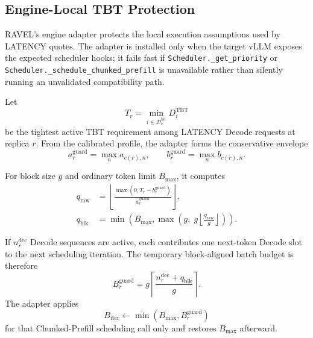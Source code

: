 \subsection{Engine-Local TBT Protection}
\label{sec:appendix:tbt-control}

RAVEL's engine adapter protects the local execution assumptions used by
LATENCY quotes.
The adapter is installed only when the target vLLM exposes the expected
scheduler hooks; it fails fast if
\texttt{Scheduler.\_get\_priority} or
\texttt{Scheduler.\_schedule\_chunked\_prefill} is unavailable rather than
silently running an unvalidated compatibility path.

Let
\begin{equation}
    T_r
    =
    \min_{i\in\mathcal{D}^{\mathrm{lat}}_r}
       D_i^{\mathrm{TBT}}
    \label{eq:appendix:tightest-tbt}
\end{equation}
be the tightest active TBT requirement among LATENCY Decode requests at
replica $r$.
From the calibrated profile, the adapter forms the conservative envelope
\begin{equation}
    a^{\mathrm{guard}}_r=\max_n a_{c(r),n},
    \qquad
    b^{\mathrm{guard}}_r=\max_n b_{c(r),n}.
    \label{eq:appendix:prefill-guard-envelope}
\end{equation}

For block size $g$ and ordinary token limit $B_{\max}$, it computes
\begin{align}
    q_{\mathrm{raw}}
    &=
      \left\lfloor
         \frac{\max(0,T_r-b^{\mathrm{guard}}_r)}
              {a^{\mathrm{guard}}_r}
      \right\rfloor,
      \label{eq:appendix:chunk-raw}\\
    q_{\mathrm{blk}}
    &=
      \min\!\left(
        B_{\max},
        \max\!\left(
          g,\;
          g\left\lfloor\frac{q_{\mathrm{raw}}}{g}\right\rfloor
        \right)
      \right).
      \label{eq:appendix:chunk-aligned}
\end{align}

If $n_r^{\mathrm{dec}}$ Decode sequences are active, each contributes one
next-token Decode slot to the next scheduling iteration.
The temporary block-aligned batch budget is therefore
\begin{equation}
    B^{\mathrm{guard}}_r
    =
    g
    \left\lceil
       \frac{n_r^{\mathrm{dec}}+q_{\mathrm{blk}}}{g}
    \right\rceil .
    \label{eq:appendix:guard-batch-budget}
\end{equation}
The adapter applies
\begin{equation}
    B_{\mathrm{iter}}
    \leftarrow
    \min(B_{\max},B^{\mathrm{guard}}_r)
    \label{eq:appendix:temporary-batch-cap}
\end{equation}
for that Chunked-Prefill scheduling call only and restores $B_{\max}$
afterward.

